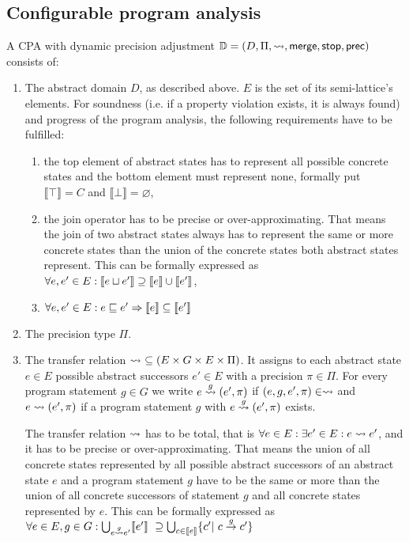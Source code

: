 \subsection{Configurable program analysis}
A CPA with dynamic precision adjustment $\mathbb{D} = (D, \Pi, \rightsquigarrow, \operatorname{\operatorname{\mathsf{merge}}}, \operatorname{\operatorname{\mathsf{stop}}}, \operatorname{\operatorname{\mathsf{prec}}} )$ consists of:

\begin{enumerate}[leftmargin=*, label=\arabic*.]
\item
The abstract domain $D$, as described above. $E$ is the set of its semi-lattice's elements.
For soundness (i.e. if a property violation exists, it is always found) and progress of the program analysis, the following requirements have to be fulfilled:\cite{Beyer2007}\cite{Beyer2008}
\begin{enumerate}[label=\alph*)]

\item
the top element of abstract states has to represent all possible concrete states and the bottom element must represent none, formally put $\llbracket \top \rrbracket = C$ and $\llbracket \bot \rrbracket = \varnothing$,

\item
the join operator has to be precise or over-approximating. That means the join of two abstract states always has to represent the same or more concrete states than the union of the concrete states both abstract states represent. This can be formally expressed as $\forall e, e' \in E: \llbracket e \sqcup e' \rrbracket \supseteq \llbracket e \rrbracket \cup \llbracket e' \rrbracket$,

\item
$\forall e, e' \in E : e \sqsubseteq e' \Rightarrow \llbracket e \rrbracket \subseteq \llbracket e' \rrbracket$
\end{enumerate}

\item
The precision type $\Pi$.

\item
The transfer relation $\transfer\ \subseteq (E \times G \times E \times \Pi)$. It assigns to each abstract state $e \in E$ possible abstract successors $e' \in E$ with a precision $\pi \in \Pi$.
For every program statement $g \in G$ we write $e \overset{g}{\rightsquigarrow} (e', \pi)$ if $(e, g, e', \pi) \in \rightsquigarrow$ and $e \rightsquigarrow (e', \pi)$ if a program statement $g$ with $e \overset{g}{\rightsquigarrow} (e', \pi)$ exists.

The transfer relation $\rightsquigarrow$ has to be total, that is $\forall e \in E: \exists e' \in E: e \rightsquigarrow e'$, and
it has to be precise or over-approximating. That means the union of all concrete states represented by all possible abstract successors of an abstract state $e$ and a program statement $g$ have to be the same or more than the union of all concrete successors of statement $g$ and all concrete states represented by $e$.
This can be formally expressed as $\forall e \in E, g \in G: \bigcup_{e \gtransfer e'} \llbracket e' \rrbracket\ \supseteq \bigcup_{c \in \llbracket e \rrbracket} \{ c' |\ c \overset{g}{\rightarrow} c' \}$


\end{enumerate}
